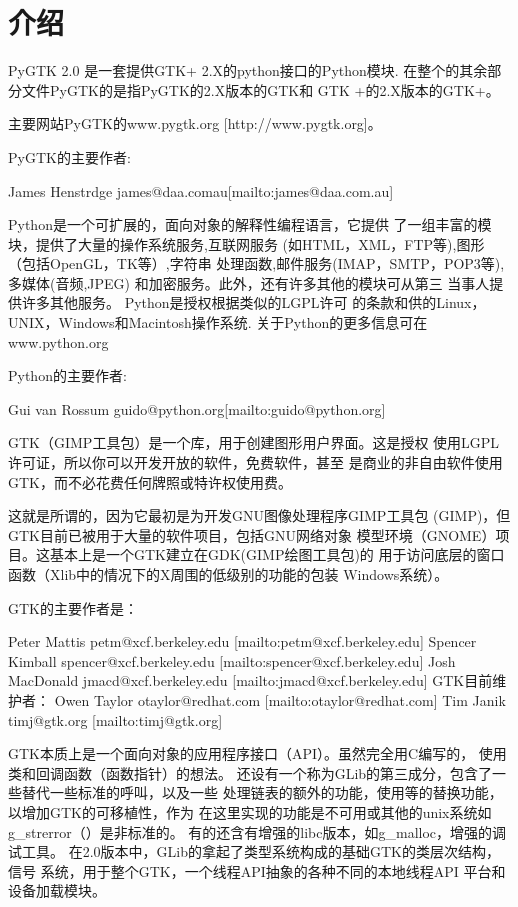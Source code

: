 \chapter{介绍}
	PyGTK 2.0 是一套提供GTK+ 2.X的python接口的Python模块.
	在整个的其余部分文件PyGTK的是指PyGTK的2.X版本的GTK和
	GTK +的2.X版本的GTK+。

	主要网站PyGTK的www.pygtk.org [http://www.pygtk.org]。

	PyGTK的主要作者:

	James Henstrdge james@daa.comau[mailto:james@daa.com.au]


	Python是一个可扩展的，面向对象的解释性编程语言，它提供
	了一组丰富的模块，提供了大量的操作系统服务,互联网服务
	(如HTML，XML，FTP等),图形（包括OpenGL，TK等）,字符串
	处理函数,邮件服务(IMAP，SMTP，POP3等),多媒体(音频,JPEG)
	和加密服务。此外，还有许多其他的模块可从第三
	当事人提供许多其他服务。 Python是授权根据类似的LGPL许可
	的条款和供的Linux，UNIX，Windows和Macintosh操作系统.
	关于Python的更多信息可在
	www.python.org

	Python的主要作者:

	Gui van Rossum guido@python.org[mailto:guido@python.org]


	GTK（GIMP工具包）是一个库，用于创建图形用户界面。这是授权
	使用LGPL许可证，所以你可以开发开放的软件，免费软件，甚至
	是商业的非自由软件使用GTK，而不必花费任何牌照或特许权使用费。	


	这就是所谓的，因为它最初是为开发GNU图像处理程序GIMP工具包
	(GIMP)，但GTK目前已被用于大量的软件项目，包括GNU网络对象
	模型环境（GNOME）项目。这基本上是一个GTK建立在GDK(GIMP绘图工具包)的
	用于访问底层的窗口函数（Xlib中的情况下的X周围的低级别的功能的包装
	Windows系统）。
	
	GTK的主要作者是：

	Peter Mattis petm@xcf.berkeley.edu [mailto:petm@xcf.berkeley.edu]
	Spencer Kimball spencer@xcf.berkeley.edu [mailto:spencer@xcf.berkeley.edu]
	Josh MacDonald jmacd@xcf.berkeley.edu [mailto:jmacd@xcf.berkeley.edu]
	GTK目前维护者：
	Owen Taylor otaylor@redhat.com [mailto:otaylor@redhat.com]
	Tim Janik timj@gtk.org [mailto:timj@gtk.org]

	GTK本质上是一个面向对象的应用程序接口（API）。虽然完全用C编写的，
	使用类和回调函数（函数指针）的想法。
	还设有一个称为GLib的第三成分，包含了一些替代一些标准的呼叫，以及一些
	处理链表的额外的功能，使用等的替换功能，以增加GTK的可移植性，作为
	在这里实现的功能是不可用或其他的unix系统如g\_strerror（）是非标准的。
	有的还含有增强的libc版本，如g\_malloc，增强的调试工具。
	在2.0版本中，GLib的拿起了类型系统构成的基础GTK的类层次结构，信号
	系统，用于整个GTK，一个线程API抽象的各种不同的本地线程API
	平台和设备加载模块。

